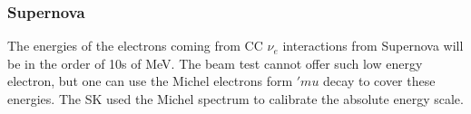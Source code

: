 \subsubsection{Supernova}
The energies of the electrons coming from CC $\nu_e$ interactions from Supernova will be in the order of 10s of MeV. 
The beam test cannot offer such low energy electron, but one can use the Michel electrons form $'mu$ decay to cover these energies. The SK used the Michel spectrum to calibrate the absolute energy scale. 



